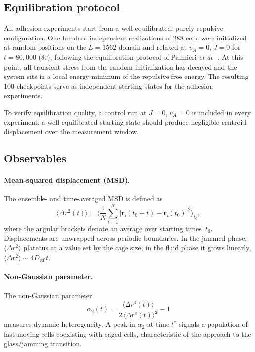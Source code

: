 \documentclass[aps,pre,twocolumn,superscriptaddress,longbibliography]{revtex4-2}
\newcommand{\vA}{v_{\!A}}                  %
\begin{document}
\subsection{Equilibration protocol}
\label{sec:methods:eq}

All adhesion experiments start from a well-equilibrated, purely repulsive
configuration.  One hundred independent realizations of 288 cells were
initialized at random positions on the $L = 1562$ domain and relaxed at
$\vA = 0$, $J = 0$ for $t = 80{,}000$ ($8\tau$), following the equilibration
protocol of Palmieri \textit{et al.}~\cite{Palmieri2015}.  At this point, all
transient stress from the random initialization has decayed and the system
sits in a local energy minimum of the repulsive free energy.  The resulting
100 checkpoints serve as independent starting states for the adhesion
experiments.

To verify equilibration quality, a control run at $J = 0$, $\vA = 0$ is
included in every experiment: a well-equilibrated starting state should
produce negligible centroid displacement over the measurement window.

\subsection{Observables}
\label{sec:methods:obs}

\paragraph{Mean-squared displacement (MSD).}
The ensemble- and time-averaged MSD is defined as
%
\begin{equation}
  \langle \Delta r^2(t) \rangle
    = \biggl\langle \frac{1}{N}\sum_{i=1}^{N}
      |\bm{r}_i(t_0 + t) - \bm{r}_i(t_0)|^2 \biggr\rangle_{t_0},
  \label{eq:msd}
\end{equation}
%
where the angular brackets denote an average over starting times~$t_0$.
Displacements are unwrapped across periodic boundaries.  In the jammed phase,
$\langle \Delta r^2 \rangle$ plateaus at a value set by the cage size; in the
fluid phase it grows linearly, $\langle \Delta r^2 \rangle \sim 4 D_{\mathrm{eff}}\,t$.

\paragraph{Non-Gaussian parameter.}
The non-Gaussian parameter
%
\begin{equation}
  \alpha_2(t)
    = \frac{\langle \Delta r^4(t)\rangle}
           {2\,\langle \Delta r^2(t)\rangle^2} - 1
  \label{eq:alpha2}
\end{equation}
%
measures dynamic heterogeneity.  A peak in $\alpha_2$ at time $t^*$ signals
a population of fast-moving cells coexisting with caged cells, characteristic
of the approach to the glass/jamming transition.
\end{document}
